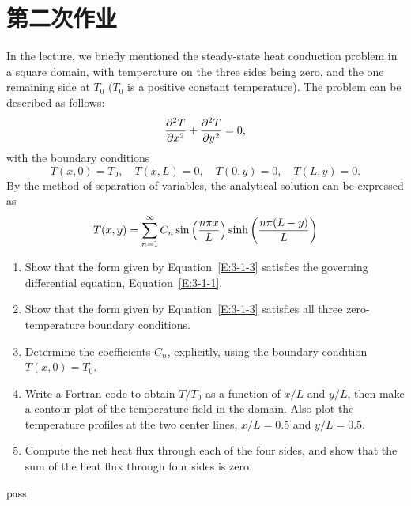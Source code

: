 \section{第二次作业}

\begin{homework}[label={H:3-1}]
    In the lecture, we briefly mentioned the steady-state heat conduction problem in a square domain, with temperature on the three sides being zero, and the one remaining side at $T_0$ ($T_0$ is a positive constant temperature). The problem can be described as follows:
    \begin{equation}\label{E:3-1-1}
        \pdv[2]{T}{x} + \pdv[2]{T}{y} = 0,
    \end{equation}
    with the boundary conditions
    \begin{equation}\label{E:3-1-2}
        T(x, 0) = T_0, \quad
        T(x, L) =   0, \quad
        T(0, y) =   0, \quad
        T(L, y) =   0.
    \end{equation}
    By the method of separation of variables, the analytical solution can be expressed as
    \begin{equation}\label{E:3-1-3}
        T(x, y) = \sum_{n=1}^\infty C_n\sin\qty(\frac{n\pi x}{L})\sinh\qty(\frac{n\pi (L-y)}{L})
    \end{equation}

    \begin{enumerate}[label=(\alph*)]
        \item Show that the form given by Equation~\eqref{E:3-1-3} satisfies the governing differential equation, Equation~\eqref{E:3-1-1}.
        \item Show that the form given by Equation~\eqref{E:3-1-3} satisfies all three zero-temperature boundary conditions.
        \item Determine the coefficients $C_n$, explicitly, using the boundary condition $T(x, 0)=T_0$.
        \item Write a Fortran code to obtain $T/T_0$ as a function of $x/L$ and $y/L$, then make a contour plot of the temperature field in the domain. Also plot the temperature profiles at the two center lines, $x/L=0.5$ and $y/L=0.5$.
        \item Compute the net heat flux through each of the four sides, and show that the sum of the heat flux through four sides is zero.
    \end{enumerate}
\end{homework}

pass



